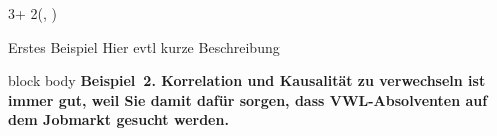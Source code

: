 \documentclass{beamer}
\newlength{\blockOne}
\newlength{\blockTwo}
\begin{document}
\begin{frame}[t]




\begin{textblock*}{3\colwidth + 2\colsep}(\leftmargin, \blockTwo)

\begin{alertblock}{%
	\begin{minipage}[b]{60pt}
		\RaggedRight
		\noindent\hspace{-10pt}
	\end{minipage}%
	\begin{minipage}[b]{3\colwidth+2\colsep-125pt}\strut%
		Erstes Beispiel \;
		{\mdseries Hier evtl kurze Beschreibung}
	\end{minipage}%
}
	\vspace{-0.25cm}
	\begin{minipage}{\textwidth}
		\begin{beamercolorbox}[
			ht = 19.75cm, 
			wd = \linewidth, 
			left
		]{block body}
			\centering\textbf{\boldmath Beispiel~2.\; Korrelation und Kausalität zu verwechseln ist immer gut, weil Sie damit dafür sorgen, dass VWL-Absolventen auf dem Jobmarkt gesucht werden.}\par
		\end{beamercolorbox}
	\end{minipage}%
	\vspace{0.5cm}
\end{alertblock}



\end{textblock*}
\end{frame}
\end{document}
